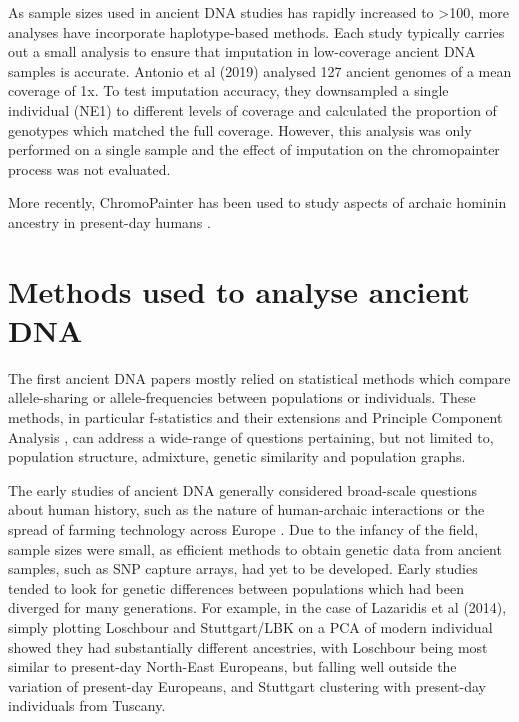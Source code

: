 As sample sizes used in ancient DNA studies has rapidly increased to >100, more analyses have incorporate haplotype-based methods. Each study typically carries out a small analysis to ensure that imputation in low-coverage ancient DNA samples is accurate. Antonio et al (2019) \cite{antonio2019ancient} analysed 127 ancient genomes of a mean coverage of 1x. To test imputation accuracy, they downsampled a single individual (NE1) to different levels of coverage and calculated the proportion of genotypes which matched the full coverage. However, this analysis was only performed on a single sample and the effect of imputation on the chromopainter process was not evaluated. 

More recently, ChromoPainter has been used to study aspects of archaic hominin ancestry in present-day humans \cite{JACOBS20191010, teixeira2021widespread}. 

\section{Methods used to analyse ancient DNA}

The first ancient DNA papers mostly relied on statistical methods which compare allele-sharing or allele-frequencies between populations or individuals. These methods, in particular f-statistics and their extensions \cite{Green2010, Patterson2012, peter2016admixture} and Principle Component Analysis \cite{price2006principal}, can address a wide-range of questions pertaining, but not limited to, population structure, admixture, genetic similarity and population graphs. 

The early studies of ancient DNA generally considered broad-scale questions about human history, such as the nature of human-archaic interactions or the spread of farming technology across Europe \cite{Lazaridis2014}. Due to the infancy of the field, sample sizes were small, as efficient methods to obtain genetic data from ancient samples, such as SNP capture arrays, had yet to be developed. Early studies tended to look for genetic differences between populations which had been diverged for many generations. For example, in the case of Lazaridis et al (2014), simply plotting Loschbour and Stuttgart/LBK on a PCA of modern individual showed they had substantially different ancestries, with Loschbour being most similar to present-day North-East Europeans, but falling well outside the variation of present-day Europeans, and Stuttgart clustering with present-day individuals from Tuscany. 

